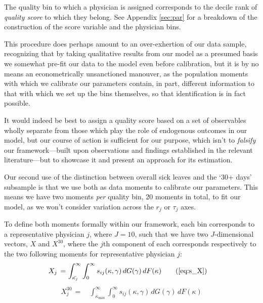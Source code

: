 \documentclass[../main.tex]{subfiles}
\begin{document}
The quality bin to which a physician is assigned corresponds to the decile rank of \textit{quality score} to which they belong. See Appendix \ref{sec:par} for a breakdown of the construction of the score variable and the physician bins.

This procedure does perhaps amount to an over-exhertion of our data sample, recognizing that by taking qualitative results from our model as a presumed basis we somewhat pre-fit our data to the model even before calibration, but it is by no means an econometrically unsanctioned manouver, as the population moments with which we calibrate our parameters contain, in part, different information to that with which we set up the bins themselves, so that identification is in fact possible. 

It would indeed be best to assign a quality score based on a set of observables wholly separate from those which play the role of endogenous outcomes in our model, but our course of action is sufficient for our purpose, which isn't to \textit{falsify} our framework—built upon observations and findings established in the relevant literature—but to showcase it and present an approach for its estimation.

Our second use of the distinction between overall sick leaves and the `30+ days' subsample is that we use both as data moments to calibrate our parameters. This means we have two moments \textit{per} quality bin, 20 moments in total, to fit our model, as we won't consider variation across the $r_j$ or $\tau_j$ axes.

To define both moments formally within our framework, each bin corresponds to a representative physician $j$, where $J = 10$, such that we have two $J$-dimensional vectors, $X$ and $X^{30}$, where the $j$th component of each corresponds respectively to the two following moments for representative physician $j$:
\begin{align}
    X_j \,=\, &  \int_{\bar{\kappa_j}}^{\infty} \int_{0}^{\infty}s_{ij}(\kappa, \gamma)  \,dG(\gamma) \,dF(\kappa) \tag{\ref{eq:s_X}}
\end{align}
\begin{align}
    X_j^{30} \,=\, & \int_{\bar{\kappa}_{\max}}^{\infty} \int_{0}^{\infty}s_{ij}(\kappa, \gamma)  \,dG(\gamma) \,dF(\kappa)
    \label{eq:X30}
\end{align}
\end{document}
